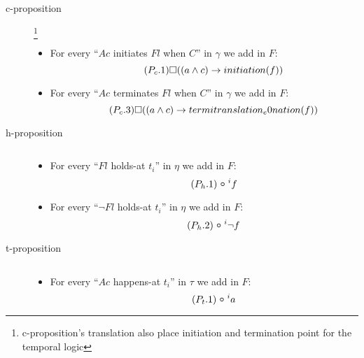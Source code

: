 \begin{description}
  \item[c-proposition]\footnote{c-proposition's translation also place initiation and termination point for the temporal logic}
  \begin{itemize}
    \item For every “$Ac$ initiates $Fl$ when $C$” in $\gamma$ we add in $F$:
    \begin{equation}\tag{$P_c.1$}
      \square((a\land c)\rightarrow initiation(f))
    \end{equation}
    \item For every “$Ac$ terminates $Fl$ when $C$” in $\gamma$ we add in $F$:
    \begin{equation}\tag{$P_c.3$}
      \square((a\land c)\rightarrow termitranslation_e0nation(f))
    \end{equation}
  \end{itemize}
  \item[h-proposition] $ $
  \begin{itemize}
    \item For every “$Fl$ holds-at $t_i$” in $\eta$ we add in $F$:
    \begin{equation}\tag{$P_h.1$}
      \next^{i}f
    \end{equation}
    \item For every “$\neg Fl$ holds-at $t_i$” in $\eta$ we add in $F$:
    \begin{equation}\tag{$P_h.2$}
      \next^{i} \neg f
    \end{equation}
  \end{itemize}
  \item[t-proposition] $ $
  \begin{itemize}
    \item For every “$Ac$ happens-at $t_i$” in $\tau$ we add in $F$:
    \begin{equation}\tag{$P_t.1$}
      \next^{i}a
    \end{equation}
  \end{itemize}
\end{description}

